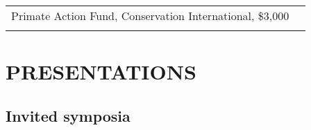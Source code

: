 \documentclass[11pt,english]{article}
\providecommand{\tabularnewline}{\\}
\begin{document}
\renewcommand{\arraystretch}{1.2}
\begin{tabularx}{\textwidth}{@{}>{\raggedright}p{5.25in} >{\raggedleft}X@{}}

Primate Action Fund, Conservation International, \$3,000 & 2004\tabularnewline

\vspace{0.5ex}
\end{tabularx}



\section*{PRESENTATIONS}
\vspace{-0.5ex}

\subsection*{Invited symposia}
\vspace{-1ex}

\end{document}
